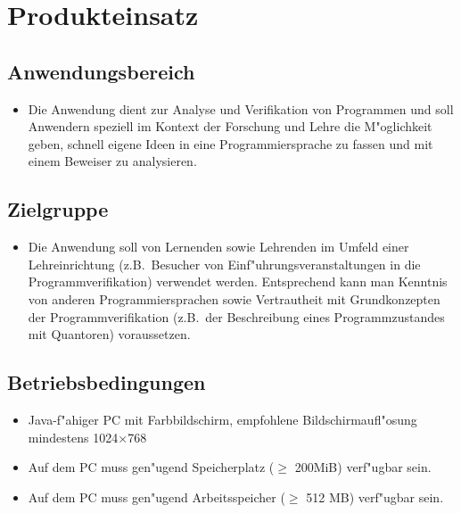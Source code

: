 \section{Produkteinsatz}%

\subsection{Anwendungsbereich}%

\begin{itemize}%
    \item Die Anwendung dient zur Analyse und \see Verifikation von Programmen und soll Anwendern speziell im Kontext der Forschung und Lehre die M"oglichkeit geben, schnell eigene Ideen in eine Programmiersprache zu fassen und mit einem \see Beweiser zu analysieren.%
\end{itemize}%

\subsection{Zielgruppe}%

\begin{itemize}%
    \item Die Anwendung soll von Lernenden sowie Lehrenden im Umfeld einer Lehreinrichtung (z.B.\ Besucher von Einf"uhrungsveranstaltungen in die Programmverifikation) verwendet werden. Entsprechend kann man Kenntnis von anderen Programmiersprachen sowie Vertrautheit mit Grundkonzepten der Programmverifikation (z.B.\ der Beschreibung eines \see Programmzustandes mit \see Quantoren) voraussetzen.%
\end{itemize}%

\subsection{Betriebsbedingungen}%

\begin{itemize}%
    \item \see Java-f"ahiger PC mit Farbbildschirm, empfohlene Bildschirmaufl"osung mindestens 1024$\times$768%
    \item Auf dem PC muss gen"ugend Speicherplatz ($\ge$ 200MiB) verf"ugbar sein.%
    \item Auf dem PC muss gen"ugend Arbeitsspeicher ($\ge$ 512 MB) verf"ugbar sein.%
\end{itemize}%
